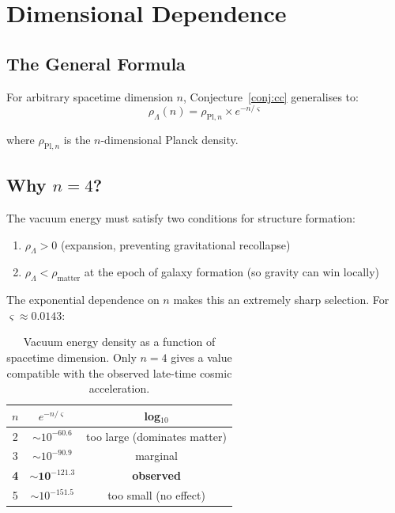 \documentclass[11pt,a4paper]{article}
\theoremstyle{definition}
\newcommand{\strain}{\varsigma}            %
\newcommand{\rhoL}{\rho_{\Lambda}}
\begin{document}
\section{Dimensional Dependence}

\subsection{The General Formula}

For arbitrary spacetime dimension $n$, Conjecture~\ref{conj:cc} generalises to:
\begin{equation}\label{eq:rhoL-n}
    \rhoL(n) = \rho_{\text{Pl},n} \times e^{-n/\strain}
\end{equation}

where $\rho_{\text{Pl},n}$ is the $n$-dimensional Planck density.

\subsection{Why $n = 4$?}

The vacuum energy must satisfy two conditions for structure formation:
\begin{enumerate}[nosep]
    \item $\rhoL > 0$ (expansion, preventing gravitational recollapse)
    \item $\rhoL < \rho_{\text{matter}}$ at the epoch of galaxy formation (so gravity can win locally)
\end{enumerate}

The exponential dependence on $n$ makes this an extremely sharp selection. For $\strain \approx 0.0143$:

\begin{table}[h]
\centering
\begin{tabular}{ccc}
\toprule
$n$ & $e^{-n/\strain}$ & log$_{10}$ \\
\midrule
2 & $\sim 10^{-60.6}$ & too large (dominates matter) \\
3 & $\sim 10^{-90.9}$ & marginal \\
\textbf{4} & $\sim \mathbf{10^{-121.3}}$ & \textbf{observed} \\
5 & $\sim 10^{-151.5}$ & too small (no effect) \\
\bottomrule
\end{tabular}
\caption{Vacuum energy density as a function of spacetime dimension. Only $n = 4$ gives a value compatible with the observed late-time cosmic acceleration.}
\end{table}
\end{document}
